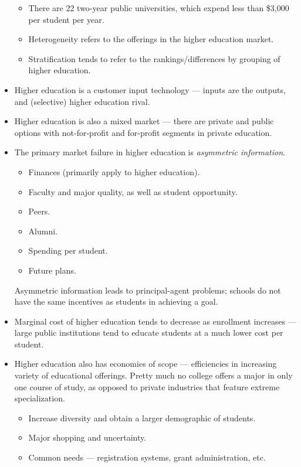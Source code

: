 \documentclass[10pt]{extarticle}
\begin{document}
\begin{itemize}
\begin{itemize}
        \item There are 22 two-year public universities, which expend less than \$3,000 per student per year.
        \item Heterogeneity refers to the offerings in the higher education market.
        \item Stratification tends to refer to the rankings/differences by grouping of higher education.
      \end{itemize}
    \item Higher education is a customer input technology --- inputs are the outputs, and (selective) higher education rival.
    \item Higher education is also a mixed market --- there are private and public options with not-for-profit and for-profit segments in private education.
    \item The primary market failure in higher education is \textit{asymmetric information}.
      \begin{itemize}
        \item Finances (primarily apply to higher education).
        \item Faculty and major quality, as well as student opportunity.
        \item Peers.
        \item Alumni.
        \item Spending per student.
        \item Future plans.
      \end{itemize}
      Asymmetric information leads to principal-agent problems; schools do not have the same incentives as students in achieving a goal.
    \item Marginal cost of higher education tends to decrease as enrollment increases --- large public institutions tend to educate students at a much lower cost per student.
    \item Higher education also has economies of scope --- efficiencies in increasing variety of educational offerings. Pretty much no college offers a major in only one course of study, as opposed to private industries that feature extreme specialization.
      \begin{itemize}
        \item Increase diversity and obtain a larger demographic of students.
        \item Major shopping and uncertainty.
        \item Common needs --- registration systems, grant administration, etc.

\end{itemize}
\end{itemize}
\end{document}
